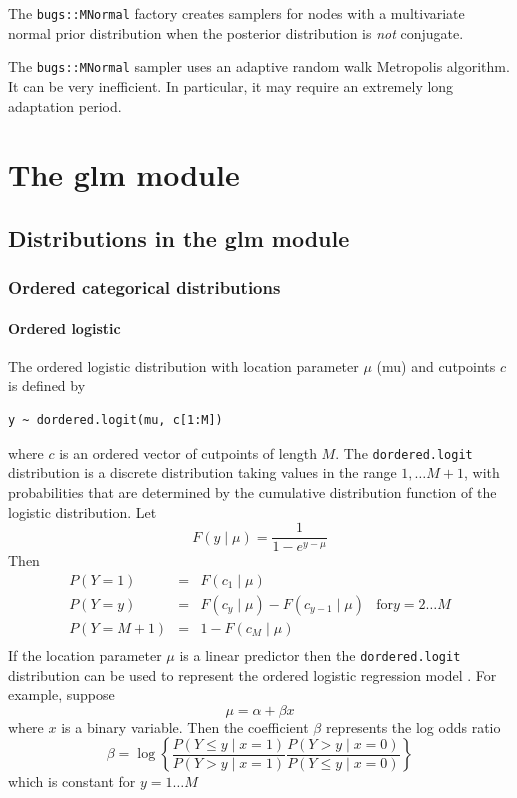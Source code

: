\documentclass[11pt, a4paper, titlepage]{report}
\begin{document}
{The \texttt{bugs::MNormal} factory creates samplers for nodes with a
multivariate normal prior distribution when the posterior distribution
is {\em not} conjugate.

The \texttt{bugs::MNormal} sampler uses an adaptive random walk
Metropolis algorithm. It can be very inefficient. In particular, it
may require an extremely long adaptation period.


\chapter{The glm module}
\label{chapter:glm}

\section{Distributions in the glm module}
\label{section:glm:distributions}

\subsection{Ordered categorical distributions}
\label{glm:dordered.categorical}

\subsubsection{Ordered logistic}

The ordered logistic distribution with location parameter $\mu$ (mu)
and cutpoints $c$ is defined by
\begin{verbatim}
y ~ dordered.logit(mu, c[1:M])
\end{verbatim}
where $c$ is an ordered vector of cutpoints of length $M$. The
\texttt{dordered.logit} distribution is a discrete distribution
taking values in the range $1, \ldots M+1$, with probabilities
that are determined by the cumulative distribution function
of the logistic distribution. Let
\[
F(y \mid \mu) = \frac{1}{1 - e^{y-\mu}}
\]
Then
\[
\begin{array}{lcll}
  P(Y = 1) & = & F(c_1 \mid \mu) & \\
  P(Y = y) & = & F(c_{y} \mid \mu) - F(c_{y-1} \mid \mu) & \text{for} y=2 \ldots M \\
  P(Y = M+1) & = & 1 - F(c_M \mid \mu) & \\
\end{array}
\]
If the location parameter $\mu$ is a linear predictor then the
\texttt{dordered.logit} distribution can be used to represent the
ordered logistic regression model \citep{McCullagh1980}. For example,
suppose
\[
\mu = \alpha + \beta x
\]
where $x$ is a binary variable. Then the coefficient $\beta$
represents the log odds ratio
\[
\beta = \log
\left\{
\frac{P\left(Y \leq y \mid x=1\right)}{P\left(Y > y \mid x=1\right)}
\frac{P\left(Y > y \mid x=0\right)}{P\left(Y \leq y \mid x=0\right)}
\right\}
\]
which is constant for $y = 1 \ldots M$
     

}
\end{document}
